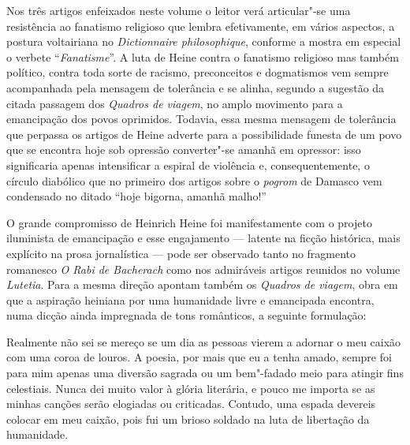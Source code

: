 Nos três artigos enfeixados neste volume o leitor verá articular"-se
uma resistência ao fanatismo religioso que lembra efetivamente, em
vários aspectos, a postura voltairiana no \textit{Dictionnaire
philosophique}, conforme a mostra em especial o verbete
“\textit{Fanatisme}”. A luta de Heine contra o fanatismo religioso mas
também político, contra toda sorte de racismo, preconceitos e
dogmatismos vem sempre acompanhada pela mensagem de tolerância e se
alinha, segundo a sugestão da citada passagem dos \textit{Quadros de
viagem}, no amplo movimento para a emancipação dos povos oprimidos.
Todavia, essa mesma mensagem de tolerância que perpassa os artigos de
Heine adverte para a possibilidade funesta de um povo que se encontra
hoje sob opressão converter"-se amanhã em opressor: isso significaria
apenas intensificar a espiral de violência e, consequentemente, o
círculo diabólico que no primeiro dos artigos sobre o \textit{pogrom}
de Damasco vem condensado no ditado “hoje bigorna, amanhã malho!”

 O grande compromisso de Heinrich Heine foi manifestamente com o projeto
iluminista de emancipação e esse engajamento --- latente na ficção
histórica, mais explícito na prosa jornalística --- pode ser observado
tanto no fragmento romanesco \textit{O Rabi de Bacherach} como nos
admiráveis artigos reunidos no volume \textit{Lutetia}. Para a mesma
direção apontam também os \textit{Quadros de viagem}, obra em que a
aspiração heiniana por uma humanidade livre e emancipada encontra, numa
dicção ainda impregnada de tons românticos, a seguinte formulação:

\begin{hedraquote}
Realmente não sei se mereço se um dia as pessoas vierem a adornar o
meu caixão com uma coroa de louros. A poesia, por mais que eu a tenha
amado, sempre foi para mim apenas uma diversão sagrada ou um
bem"-fadado meio para atingir fins celestiais. Nunca dei muito valor à
glória literária, e pouco me importa se as minhas canções serão
elogiadas ou criticadas. Contudo, uma espada devereis colocar em meu
caixão, pois fui um brioso soldado na luta de libertação da
humanidade.
\end{hedraquote}
